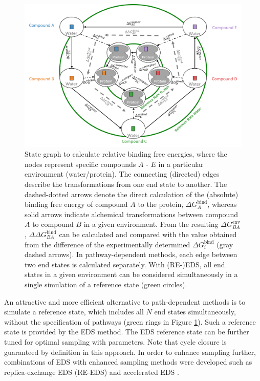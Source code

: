 \begin{figure}[h!]
    \centering
    \includegraphics[width=\columnwidth]{fig/intro/State_graph.png}
    \caption{State graph to calculate relative binding free energies, where the nodes represent specific compounds $A$ - $E$ in a particular environment (water/protein). 
    The connecting (directed) edges describe the transformations from one end state to another. The dashed-dotted arrows denote the direct calculation of the (absolute) binding free energy of compound $A$ to the protein, $\Delta G_{A}^\text{bind}$, whereas solid arrows indicate alchemical transformations between compound $A$ to compound $B$ in a given environment. From the resulting $\Delta G_{BA}^\text{env}$, $\Delta \Delta G^\text{bind}_{BA}$ can be calculated and compared with the value obtained from the difference of the experimentally determined $\Delta G_{i}^\text{bind}$ (gray dashed arrows).
    In pathway-dependent methods, each edge between two end states is calculated separately. With (RE-)EDS, all end states in a given environment can be considered simultaneously in a single simulation of a reference state (green circles).}
    \label{fig: StateGraph}
\end{figure}

An attractive and more efficient alternative to path-dependent methods is to simulate a reference state, which includes all $N$ end states simultaneously, without the specification of pathways (green rings in Figure \ref{fig: StateGraph}). Such a reference state is provided by the EDS \cite{Christ2007, Christ2008, Christ2009, Riniker2011} method. The EDS reference state can be further tuned for optimal sampling with parameters. Note that cycle closure is guaranteed by definition in this approach.
%
In order to enhance sampling further, combinations of EDS with enhanced sampling methods were developed such as replica-exchange EDS (RE-EDS) \cite{Lee2014, Sidler2016, Sidler2017} and accelerated EDS \cite{Perthold2018, Perthold2020}.

